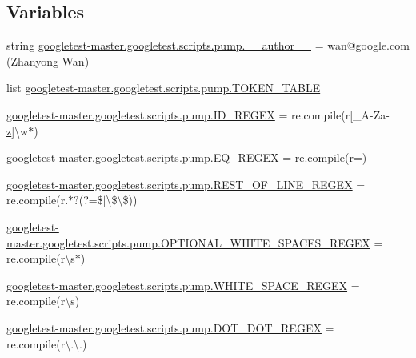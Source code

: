 \subsection*{Variables}
\begin{DoxyCompactItemize}
\item 
string \mbox{\hyperlink{namespacegoogletest-master_1_1googletest_1_1scripts_1_1pump_add9eaede5cb65627b6d69a2d107fb850}{googletest-\/master.\+googletest.\+scripts.\+pump.\+\_\+\+\_\+author\+\_\+\+\_\+}} = \textquotesingle{}wan@google.\+com (Zhanyong Wan)\textquotesingle{}
\item 
list \mbox{\hyperlink{namespacegoogletest-master_1_1googletest_1_1scripts_1_1pump_a67ec39089f7871df1b8d36de71d004fb}{googletest-\/master.\+googletest.\+scripts.\+pump.\+T\+O\+K\+E\+N\+\_\+\+T\+A\+B\+LE}}
\item 
\mbox{\hyperlink{namespacegoogletest-master_1_1googletest_1_1scripts_1_1pump_a383699e95c9717445e08b3b86de989f1}{googletest-\/master.\+googletest.\+scripts.\+pump.\+I\+D\+\_\+\+R\+E\+G\+EX}} = re.\+compile(r\textquotesingle{}\mbox{[}\+\_\+A-\/Za-\/\mbox{\hyperlink{_obj__test_2lib_2googletest-master_2googlemock_2test_2gmock-matchers__test_8cc_a196ff6a287f53f758b1506f21269fc77}{z}}\mbox{]}\textbackslash{}w$\ast$\textquotesingle{})
\item 
\mbox{\hyperlink{namespacegoogletest-master_1_1googletest_1_1scripts_1_1pump_a81c946d3356de525e74c8755fed4cd71}{googletest-\/master.\+googletest.\+scripts.\+pump.\+E\+Q\+\_\+\+R\+E\+G\+EX}} = re.\+compile(r\textquotesingle{}=\textquotesingle{})
\item 
\mbox{\hyperlink{namespacegoogletest-master_1_1googletest_1_1scripts_1_1pump_a56111659f999efdf4903cf17f20ec2c3}{googletest-\/master.\+googletest.\+scripts.\+pump.\+R\+E\+S\+T\+\_\+\+O\+F\+\_\+\+L\+I\+N\+E\+\_\+\+R\+E\+G\+EX}} = re.\+compile(r\textquotesingle{}.$\ast$?(?=\$$\vert$\textbackslash{}\$\textbackslash{}\$)\textquotesingle{})
\item 
\mbox{\hyperlink{namespacegoogletest-master_1_1googletest_1_1scripts_1_1pump_a781e93797bcd221c6268757ae353ae79}{googletest-\/master.\+googletest.\+scripts.\+pump.\+O\+P\+T\+I\+O\+N\+A\+L\+\_\+\+W\+H\+I\+T\+E\+\_\+\+S\+P\+A\+C\+E\+S\+\_\+\+R\+E\+G\+EX}} = re.\+compile(r\textquotesingle{}\textbackslash{}s$\ast$\textquotesingle{})
\item 
\mbox{\hyperlink{namespacegoogletest-master_1_1googletest_1_1scripts_1_1pump_ac8a455666ce72b77a67ee310f30263ab}{googletest-\/master.\+googletest.\+scripts.\+pump.\+W\+H\+I\+T\+E\+\_\+\+S\+P\+A\+C\+E\+\_\+\+R\+E\+G\+EX}} = re.\+compile(r\textquotesingle{}\textbackslash{}s\textquotesingle{})
\item 
\mbox{\hyperlink{namespacegoogletest-master_1_1googletest_1_1scripts_1_1pump_ad09a9946b534a749badb085db9db7126}{googletest-\/master.\+googletest.\+scripts.\+pump.\+D\+O\+T\+\_\+\+D\+O\+T\+\_\+\+R\+E\+G\+EX}} = re.\+compile(r\textquotesingle{}\textbackslash{}.\textbackslash{}.\textquotesingle{})
\end{DoxyCompactItemize}
